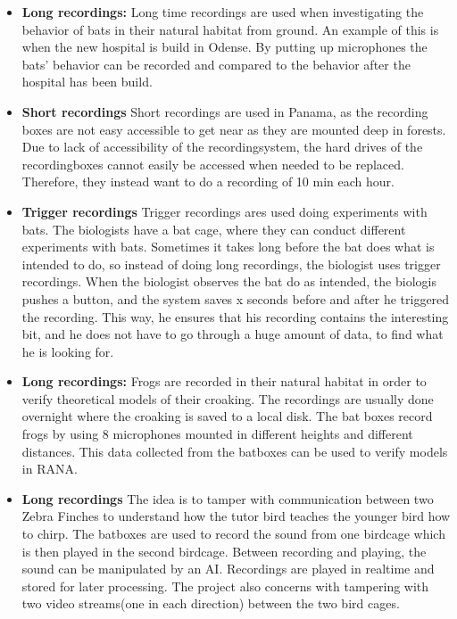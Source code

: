 \begin{itemize}
	\item \textbf{Long recordings:} Long time recordings are used when investigating the behavior of bats in their natural habitat from ground. An example of this is when the new hospital is build in Odense. By putting up microphones the bats’ behavior can be recorded and compared to the behavior after the hospital has been build.
	
	 \item \textbf{Short recordings} Short recordings are used in Panama, as the recording boxes are not easy accessible to get near as they are mounted deep in forests. Due to lack of accessibility of the recordingsystem, the hard drives of the recordingboxes cannot easily be accessed when needed to be replaced. Therefore, they instead want to do a recording of 10 min each hour.

	\item \textbf{Trigger recordings} Trigger recordings ares used doing experiments with bats. The biologists have a bat cage, where they can conduct different experiments with bats. Sometimes it takes long before the bat does what is intended to do, so instead of doing long recordings, the biologist uses trigger recordings. When the biologist observes the bat do as intended, the biologis pushes a button, and the system saves x seconds before and after he triggered the recording. This way, he ensures that his recording contains the interesting bit, and he does not have to go through a huge amount of data, to find what he is looking for.
\end{itemize}

\begin{itemize}
	\item \textbf{Long recordings:} Frogs are recorded in their natural habitat in order to verify theoretical models of their croaking. The recordings are usually done overnight where the croaking is saved to a local disk. The bat boxes record frogs by using 8 microphones mounted in different heights and different distances. This data collected from the batboxes can be used to verify models in RANA.
\end{itemize}


\begin{itemize}
	\item \textbf{Long recordings} The idea is to tamper with communication between two Zebra Finches to understand how the tutor bird teaches the younger bird how to chirp. The batboxes are used to record the sound from one birdcage which is then played in the second birdcage. Between recording and playing, the sound can be manipulated by an AI. Recordings are played in realtime and stored for later processing. The project also concerns with tampering with two video streams(one in each direction) between the two bird cages. 
\end{itemize}


